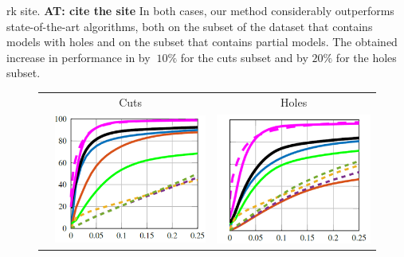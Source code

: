 \documentclass[10pt,twocolumn,letterpaper]{article}
\newcommand{\colornote}[3]{{\color{#1}\bf{#2: #3}\normalfont}}
\newcommand{\colornote}[3]{}
\newcommand {\ayellet}[1]{\colornote{blue}{AT}{#1}}
\begin{document}
rk site. \ayellet{cite the site}
In both cases, our method considerably outperforms state-of-the-art algorithms, both on the subset of the dataset that contains models with holes and on the subset that contains partial models.
The obtained increase in performance in by $~10\%$ for the cuts subset and by $20\%$ for the holes subset.

\begin{figure}[htb]
	\centering
		\setlength\tabcolsep{0.5pt}
	\begin{tabular}{ccc}
		& Cuts & Holes \\
		\rotatebox{90}{    \, \% Correspondences} &
		\includegraphics[scale=0.35]{figures/SHRECCutsCumulative16.png} & \includegraphics[scale=0.35]{figures/SHRECHolesCumulative16.png} \\

\end{tabular}
\end{figure}
\end{document}
